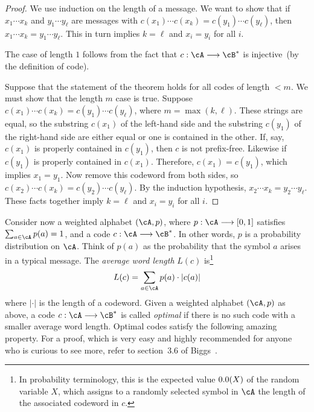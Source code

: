 \begin{proof}
We use induction on the length of a message. We want
to show that if $x_1 \cdots x_k$ and $y_1 \cdots y_\ell$ are messages
with $c(x_1) \cdots c(x_k) = c(y_1) \cdots c(y_\ell)$, then
$x_1 \cdots x_k = y_1 \cdots y_\ell$. This in turn implies $k = \ell$
and $x_i = y_i$ for all $i$.

The case of length $1$ follows from the fact that $c: \cA \to \cB^*$
is injective~(by the definition of code).

Suppose that the statement of the theorem holds for all codes of
length $< m$. We must show that the length $m$ case is true. Suppose
$c(x_1) \cdots c(x_k) = c(y_1) \cdots c(y_\ell)$, where
$m = \max(k, \ell)$. These strings are equal, so the substring
$c(x_1)$ of the left-hand side and the substring $c(y_1)$ of the
right-hand side are either equal or one is contained in the other. If,
say, $c(x_1)$ is properly contained in $c(y_1)$, then $c$ is not
prefix-free. Likewise if $c(y_1)$ is properly contained in
$c(x_1)$. Therefore, $c(x_1) = c(y_1)$, which implies $x_1 = y_1$. Now
remove this codeword from both sides, so
$c(x_2) \cdots c(x_k) = c(y_2) \cdots c(y_\ell)$. By the induction
hypothesis, $x_2 \cdots x_k = y_2 \cdots y_\ell$. These facts together
imply $k = \ell$ and $x_i = y_i$ for all $i$.
\end{proof}

Consider now a weighted alphabet $(\cA, p)$, where $p: \cA \to [0,1]$
satisfies $\sum_{a \in \cA} p(a) = 1$, and a code $c: \cA \to \cB^*$.
In other words, $p$ is a probability distribution on $\cA$. Think of
$p(a)$ as the probability that the symbol $a$ arises in a typical
message. The \emph{average word length} $L(c)$ is\footnote{
  In probability terminology, this is the
  expected value $\E(X)$ of the random
  variable $X$, which assigns to a randomly selected symbol in $\cA$
  the length of the associated codeword in $c$.
}
\[
L(c)
=
\sum_{a \in \cA} p(a) \cdot |c(a)|
\]
where $|\cdot|$ is the length of a codeword.
Given a weighted alphabet $(\cA, p)$ as
above, a code $c: \cA \to \cB^*$ is called
\emph{optimal} if there is no such code with a
smaller average word length. Optimal codes satisfy the following
amazing property. For a proof, which is very easy and highly
recommended for anyone who is curious to see more, refer to
section~3.6 of Biggs~\cite{Biggs2009}.

